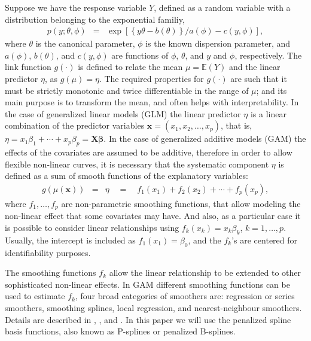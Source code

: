 \documentclass[11pt,letterpaper]{article}
\begin{document}
Suppose we have the response variable $Y$, defined as a random variable with a distribution belonging to the exponential familiy,  
\begin{eqnarray*}
p(y;\theta,\phi) &=& \exp\left[\left\{y\theta-b(\theta)\right\}/a(\phi)-c(y,\phi)\right], 
\label{eq:exponential.family}
\end{eqnarray*}
where $\theta$ is the canonical parameter, $\phi$ is the known dispersion parameter,  and $a(\phi)$, $b(\theta)$, and  $c(y,\phi)$ are functions of $\phi$,  $\theta$, and  $y$ and $\phi$, respectively.  
The link function $g(\cdot)$ is defined to relate the mean  $\mu=\mathbb{E}(Y)$ and the linear predictor $\eta$, as $g(\mu)=\eta$. The required properties for $g(\cdot)$ are such that it must be strictly monotonic and twice differentiable in the range of $\mu$; and its main purpose is to transform the mean, and often helps with interpretability.  
In the case of generalized linear models (GLM)  \citep{NelWed72} the linear predictor $\eta$ is a linear combination of the predictor variables  $\boldsymbol{x}=(x_1,x_2,\ldots,x_p )$, that is, $\eta = x_{1}\beta_1 + \cdots + x_{p}\beta_p = \boldsymbol{X}\boldsymbol{\beta}$. In the case of generalized additive models (GAM) \citep{HasTib90} the effects of the covariates are assumed to be additive, therefore in order to allow flexible non-linear curves, it is necessary that  
the systematic component $\eta$ is defined as a sum of smooth functions of the explanatory variables: 
\begin{eqnarray*}
g(\mu(\boldsymbol{x}))&=&\eta \quad=\quad f_1 (x_1 )+f_2 (x_2 )+\cdots+f_p (x_p ) , 
\end{eqnarray*}
where $f_1,\ldots,f_p$  are non-parametric smoothing functions, that allow modeling the non-linear effect that some covariates may have. And also, as a particular case it is possible to consider linear relationships using $f_k(x_k)=x_k\beta_k$, $k=1,\ldots,p$. 
Usually, the intercept is included as $f_1 (x_1 )=\beta_0$, and the $f_k$'s are centered for identifiability purposes. 

The smoothing functions $f_k$ allow the linear relationship to be extended to other sophisticated non-linear effects. 
In GAM different smoothing functions can be used to estimate $f_k$,  four broad categories of smoothers are:   
regression or series smoothers,  smoothing splines,  local regression, and nearest-neighbour smoothers.    
Details are described in  \cite{JamWitHasTib13}, \cite{Yee15}, and \cite{Woo17}. In this paper we will use the penalized spline  basis functions, also known as P-splines or penalized B-splines.
\end{document}

